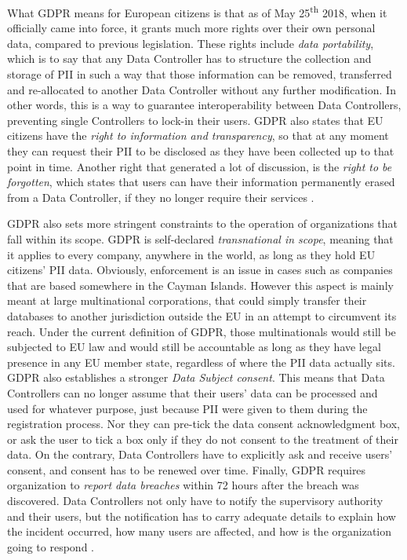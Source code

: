 What GDPR means for European citizens is that as of May 25\textsuperscript{th}
2018, when it officially came into force, it grants much more rights over their
own personal data, compared to previous legislation. These rights include
\emph{data portability}, which is to say that any Data Controller has to
structure the collection and storage of PII in such a way that those information
can be removed, transferred and re-allocated to another Data Controller without
any further modification. In other words, this is a way to guarantee
interoperability between Data Controllers, preventing single Controllers to
lock-in their users. GDPR also states that EU citizens have the \emph{right to
information and transparency}, so that at any moment they can request their PII
to be disclosed as they have been collected up to that point in time. Another
right that generated a lot of discussion, is the \emph{right to be forgotten}, which
states that users can have their information permanently erased from a Data
Controller, if they no longer require their services \cite{EU18}.

GDPR also sets more stringent constraints to the operation of organizations
that fall within its scope. GDPR is self-declared \emph{transnational in scope},
meaning that it applies to every company, anywhere in the world, as long as they hold EU
citizens' PII data. Obviously, enforcement is an issue in cases such as
companies that are based somewhere in the Cayman Islands. However this aspect is
mainly meant at large multinational corporations, that could simply
transfer their databases to another jurisdiction outside the EU in an attempt
to circumvent its reach. Under the current definition of GDPR, those
multinationals would still be subjected to EU law and would still be
accountable as long as they have legal presence in any EU member state,
regardless of where the PII data actually sits. GDPR also establishes a stronger
\emph{Data Subject consent}. This means that Data Controllers can no longer
assume that their users' data can be processed and used for whatever purpose,
just because PII were given to them during the registration process. Nor they
can pre-tick the data consent acknowledgment box, or ask the  user to tick a box
only if they do not consent to the treatment of their data. On the contrary,
Data Controllers have to explicitly ask and receive users' consent, and consent
has to be renewed over time. Finally, GDPR requires organization to \emph{report
data breaches} within 72 hours after the breach was discovered. Data Controllers
not only have to notify the supervisory authority and their users, but the
notification has to carry adequate details to explain  how the incident
occurred, how many users are affected, and how is the organization going to
respond \cite{CR17}.

